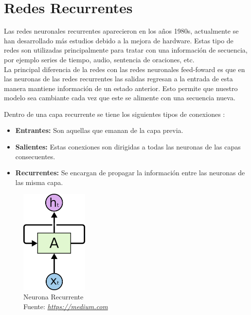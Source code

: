 \section{Redes Recurrentes}\label{redesrecurrentes}
Las redes neuronales recurrentes aparecieron en los años 1980s, actualmente se han desarrollado más estudios debido a la mejora de hardware. Estas tipo de redes son utilizadas principalmente para tratar con una información de secuencia, por ejemplo series de tiempo, audio, sentencia de oraciones, etc.\\ La principal diferencia de la redes con las redes neuronales feed-foward es que en las neuronas de las redes recurrentes las salidas regresan a la entrada de esta manera mantiene información de un estado anterior. Esto permite que nuestro modelo sea cambiante cada vez que este se alimente con una secuencia nueva.%

Dentro de una capa recurrente se tiene los siguientes tipos de conexiones :
\begin{itemize}
	\item  \textbf{Entrantes:} Son aquellas que emanan de la capa previa.
	\item  \textbf{Salientes:} Estas conexiones son dirigidas a todas las neuronas de las capas consecuentes.
	\item  \textbf{Recurrentes:} Se encargan de propagar la información entre las neuronas de las misma capa.
\end{itemize}


\begin{figure}[H]
	\centering
	\includegraphics[width=0.3\textwidth]{Figures/rnn.png}
	\caption{Neurona Recurrente \\ Fuente:  \href{https://cdn-images-1.medium.com/max/960/1*XB5c4rTCSeFQrK0aFC5IVw.png}{\textit{https://medium.com}}}
	\label{}
\end{figure}

